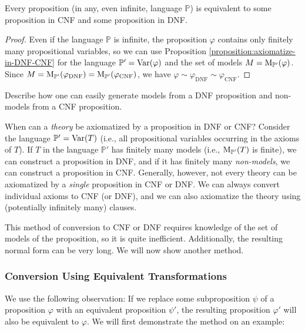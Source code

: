 \begin{corollary}
    Every proposition (in any, even infinite, language $\mathbb{P}$) is equivalent to some proposition in CNF and some proposition in DNF.
\end{corollary}
\begin{proof}
Even if the language $\mathbb{P}$ is infinite, the proposition $\varphi$ contains only finitely many propositional variables, so we can use Proposition \ref{proposition:axiomatize-in-DNF-CNF} for the language $\mathbb{P}' = \operatorname{Var}(\varphi)$ and the set of models $M = \operatorname{M}_{\mathbb{P}'}(\varphi)$. Since $M = \operatorname{M}_{\mathbb{P}'}(\varphi_{\mathrm{DNF}}) = \operatorname{M}_{\mathbb{P}'}(\varphi_{\mathrm{CNF}})$, we have $\varphi \sim \varphi_{\mathrm{DNF}} \sim \varphi_{\mathrm{CNF}}$.
\end{proof}

\begin{exercise}
Describe how one can easily generate models from a DNF proposition and non-models from a CNF proposition.
\end{exercise}

\begin{remark}
    When can a \emph{theory} be axiomatized by a proposition in DNF or CNF? Consider the language $\mathbb{P}' = \operatorname{Var}(T)$ (i.e., all propositional variables occurring in the axioms of $T$). If $T$ in the language $\mathbb{P}'$ has finitely many models (i.e., $\operatorname{M}_{\mathbb{P}'}(T)$ is finite), we can construct a proposition in DNF, and if it has finitely many \emph{non-models}, we can construct a proposition in CNF. Generally, however, not every theory can be axiomatized by a \emph{single} proposition in CNF or DNF. We can always convert individual axioms to CNF (or DNF), and we can also axiomatize the theory using (potentially infinitely many) clauses.
\end{remark}

This method of conversion to CNF or DNF requires knowledge of the set of models of the proposition, so it is quite inefficient. Additionally, the resulting normal form can be very long. We will now show another method.

\subsubsection{Conversion Using Equivalent Transformations}

We use the following observation: If we replace some subproposition $\psi$ of a proposition $\varphi$ with an equivalent proposition $\psi'$, the resulting proposition $\varphi'$ will also be equivalent to $\varphi$. We will first demonstrate the method on an example:

